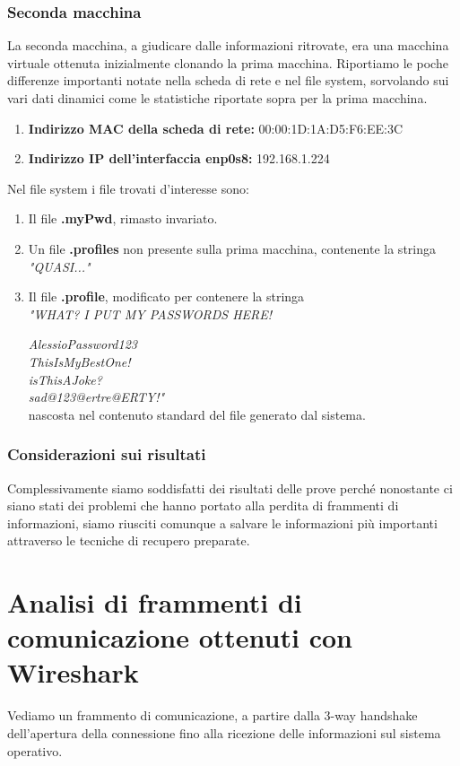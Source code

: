 \documentclass[a4paper]{report}
\begin{document}
\subsection{Seconda macchina}
La seconda macchina, a giudicare dalle informazioni ritrovate, era una macchina virtuale ottenuta inizialmente clonando la prima macchina. Riportiamo le poche differenze importanti notate nella scheda di rete e nel file system, sorvolando sui vari dati dinamici come le statistiche riportate sopra per la prima macchina.
\begin{enumerate}
	\item \textbf{Indirizzo MAC della scheda di rete:} 00:00:1D:1A:D5:F6:EE:3C
	\item \textbf{Indirizzo IP dell'interfaccia enp0s8:} 192.168.1.224
\end{enumerate}
Nel file system i file trovati d'interesse sono:
\begin{enumerate}
	\item Il file \textbf{.myPwd}, rimasto invariato.
	\item Un file \textbf{.profiles} non presente sulla prima macchina, contenente la stringa \textit{"QUASI..."}
	\item Il file \textbf{.profile}, modificato per contenere la stringa\\\textit{"WHAT? I PUT MY PASSWORDS HERE!}
	
	 \textit{AlessioPassword123}
	 \\\textit{ThisIsMyBestOne!}
	 \\\textit{isThisAJoke?}
	 \\\textit{sad@123@ertre@ERTY!"} \\nascosta nel contenuto standard del file generato dal sistema.
	 
\end{enumerate}

\subsection{Considerazioni sui risultati}
Complessivamente siamo soddisfatti dei risultati delle prove perché nonostante ci siano stati dei problemi che hanno portato alla perdita di frammenti di informazioni, siamo riusciti comunque a salvare le informazioni più importanti attraverso le tecniche di recupero preparate.

\chapter{Analisi di frammenti di comunicazione ottenuti con Wireshark}
Vediamo un frammento di comunicazione, a partire dalla 3-way handshake dell'apertura della connessione fino alla ricezione delle informazioni sul sistema operativo.
\end{document}
